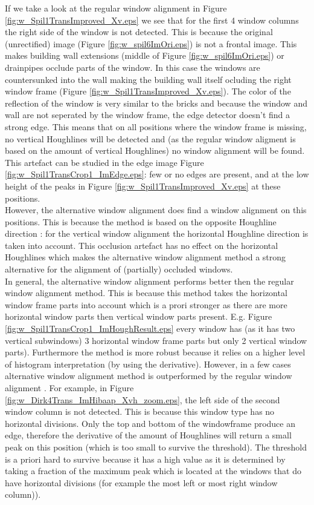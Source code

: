 \label{lab:occlusion} If we take a look at the regular window alignment in
Figure \ref{fig:w_Spil1TransImproved_Xv.eps} we see that for the first 4 window
columns the right side of the window is not detected.  This is because the
original (unrectified) image (Figure \ref{fig:w_spil6ImOri.eps}) is not a
frontal image.  This makes building wall extensions (middle of Figure
\ref{fig:w_spil6ImOri.eps}) or drainpipes occlude parts of the window.  In this
case the windows are countersunked into the wall making the building wall itself
ocluding the right window frame (Figure \ref{fig:w_Spil1TransImproved_Xv.eps}).
The color of the reflection of the window is very similar to the bricks and
because the window and wall are not seperated by the window frame, the edge
detector doesn't find a strong edge.  This means that on all positions where the
window frame is missing, no vertical Houghlines will be detected and (as the
regular window aligment is based on the amount of vertical Houghlines) no window
alignment will be found.  This artefact can be studied in the edge image Figure
\ref{fig:w_Spil1TransCrop1_ImEdge.eps}: few or no edges are present, and at the
low height of the peaks in Figure \ref{fig:w_Spil1TransImproved_Xv.eps} at these
positions.\\

However, the alternative window alignment does find a window alignment on this
positions. This is because the method is based on the opposite Houghline
direction : for the vertical window alignment the horizontal Houghline direction
is taken into account.  This occlusion artefact has no effect on the horizontal
Houghlines which makes the alternative window alignment method a strong
alternative for the alignment of (partially) occluded windows.\\

In general, the alternative window alignment performs better then the regular
window alignment method.  This is because this method takes the  horizontal
window frame parts into account which is a prori stronger as there are more
horizontal window parts then vertical window parts present.  E.g. Figure
\ref{fig:w_Spil1TransCrop1_ImHoughResult.eps} every window has (as it has two
vertical subwindows) 3 horizontal window frame parts but only 2 vertical window
parts).  Furthermore the method is more robust because it relies on a higher
level of histogram interpretation (by using the derivative).  However, in a few
cases alternative window alignment method is outperformed by the regular window
alignment . For example, in Figure
\ref{fig:w_Dirk4Trans_ImHibaap_Xvh_zoom.eps}, the left
side of the second window column is not detected.
This is because this window type has no horizontal divisions. Only the top and
bottom of the windowframe produce an edge, therefore the derivative of the
amount of Houghlines will return a small peak on this position (which is too
small to survive the threshold).  
The threshold is a priori hard to survive because it has a high value as it is
determined by taking a fraction of the maximum peak which is located at the
windows that do have horizontal divisions (for example the most left or most
right window column)). 


